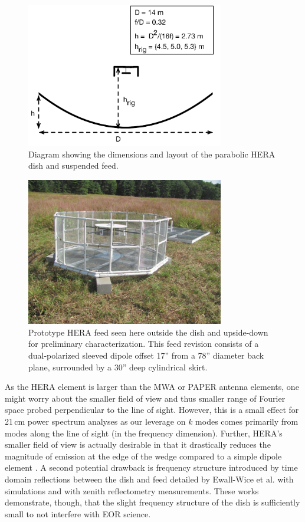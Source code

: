 \begin{figure}[h]
\centering
\includegraphics[width=3.4in]{chap3_hera_beammapping/dish_and_feed_diagram.pdf}
\caption{Diagram showing the dimensions and layout of the parabolic HERA dish and suspended feed.}
\label{fig:feeddiagram}
\end{figure}

\begin{figure}[h]
\centering
\includegraphics[width=3.4in]{chap3_hera_beammapping/feed.pdf}
\caption[Prototype HERA feed seen here outside the dish and upside-down for preliminary characterization.]{Prototype HERA feed seen here outside the dish and upside-down for preliminary characterization. This feed revision consists of a dual-polarized sleeved dipole offset 17'' from a 78'' diameter back plane, surrounded by a 30'' deep cylindrical skirt.}
\label{fig:feedphoto}
\end{figure}

As the HERA element is larger than the MWA or PAPER antenna elements, one might worry about the  smaller field of view and thus smaller range of Fourier space probed perpendicular to the line of sight. However, this is a 
small effect for 21\,cm power spectrum analyses as our leverage on $k$ modes comes primarily from modes along the line of sight (in the frequency dimension). Further, HERA's smaller field of view is actually desirable in that it drastically reduces the magnitude of emission at the edge of the wedge compared to a simple dipole element \citep{nithya15}. A second potential drawback is frequency structure introduced by time domain reflections between the dish and feed detailed by Ewall-Wice et al. \citep{ewallwice16} with simulations and \citep{patra16} with zenith reflectometry measurements. These works demonstrate, though, that the slight frequency structure of the dish is sufficiently small to not interfere with EOR science.

